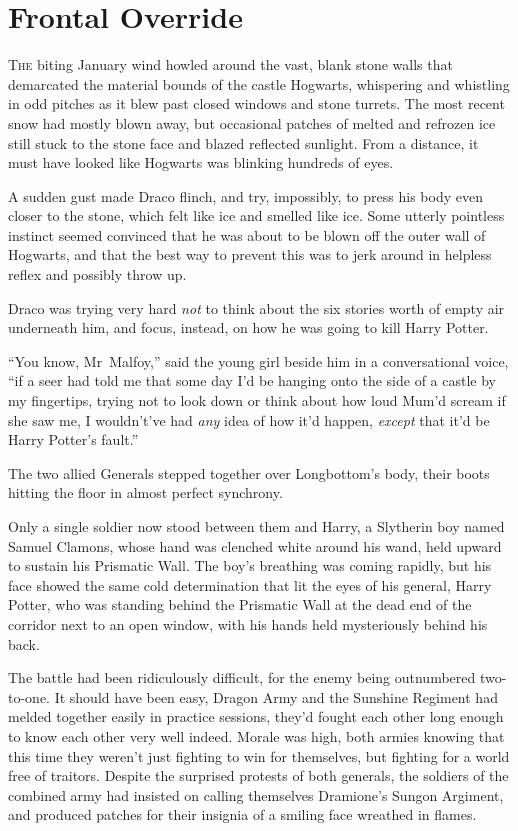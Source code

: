 \chapter{Frontal Override}

\lettrine{T}{he} biting January wind howled around the vast, blank stone walls that demarcated the material bounds of the castle Hogwarts, whispering and whistling in odd pitches as it blew past closed windows and stone turrets. The most recent snow had mostly blown away, but occasional patches of melted and refrozen ice still stuck to the stone face and blazed reflected sunlight. From a distance, it must have looked like Hogwarts was blinking hundreds of eyes.

A sudden gust made Draco flinch, and try, impossibly, to press his body even closer to the stone, which felt like ice and smelled like ice. Some utterly pointless instinct seemed convinced that he was about to be blown off the outer wall of Hogwarts, and that the best way to prevent this was to jerk around in helpless reflex and possibly throw up.

Draco was trying very hard \emph{not} to think about the six stories worth of empty air underneath him, and focus, instead, on how he was going to kill Harry Potter.

“You know, Mr~Malfoy,” said the young girl beside him in a conversational voice, “if a seer had told me that some day I’d be hanging onto the side of a castle by my fingertips, trying not to look down or think about how loud Mum’d scream if she saw me, I wouldn’t’ve had \emph{any} idea of how it’d happen, \emph{except} that it’d be Harry Potter’s fault.”


The two allied Generals stepped together over Longbottom’s body, their boots hitting the floor in almost perfect synchrony.

Only a single soldier now stood between them and Harry, a Slytherin boy named Samuel Clamons, whose hand was clenched white around his wand, held upward to sustain his Prismatic Wall. The boy’s breathing was coming rapidly, but his face showed the same cold determination that lit the eyes of his general, Harry Potter, who was standing behind the Prismatic Wall at the dead end of the corridor next to an open window, with his hands held mysteriously behind his back.

The battle had been ridiculously difficult, for the enemy being outnumbered two-to-one. It should have been easy, Dragon Army and the Sunshine Regiment had melded together easily in practice sessions, they’d fought each other long enough to know each other very well indeed. Morale was high, both armies knowing that this time they weren’t just fighting to win for themselves, but fighting for a world free of traitors. Despite the surprised protests of both generals, the soldiers of the combined army had insisted on calling themselves Dramione’s Sungon Argiment, and produced patches for their insignia of a smiling face wreathed in flames.


